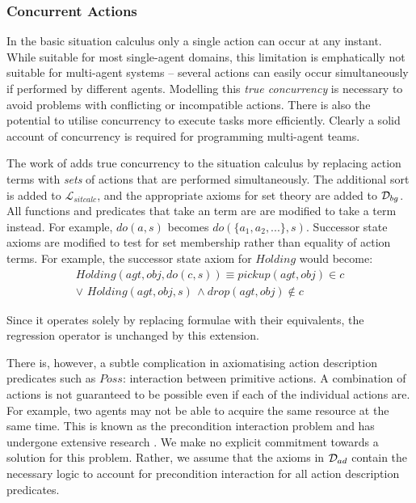 \subsubsection{Concurrent Actions}\label{sec:Background:Concurrent-Actions}

In the basic situation calculus only a single action can occur at
any instant. While suitable for most single-agent domains, this limitation
is emphatically not suitable for multi-agent systems -- several actions
can easily occur simultaneously if performed by different agents.
Modelling this \emph{true concurrency} is necessary to avoid problems
with conflicting or incompatible actions. There is also the potential
to utilise concurrency to execute tasks more efficiently. Clearly
a solid account of concurrency is required for programming multi-agent
teams.

The work of \citep{lin92sc_conc,pinto94temporal,reiter96sc_nat_conc}
adds true concurrency to the situation calculus by replacing action
terms with \emph{sets} of actions that are performed simultaneously.
The additional sort  is added to $\mathcal{L}_{sitcalc}$,
and the appropriate axioms for set theory are added to $\mathcal{D}_{bg}$.
All functions and predicates that take an  term are are
modified to take a  term instead. For example, $do(a,s)$
becomes $do(\{a_{1},a_{2},...\},s)$. Successor state axioms are modified
to test for set membership rather than equality of action terms. For
example, the successor state axiom for $Holding$ would become:\begin{multline*}
Holding(agt,obj,do(c,s))\equiv pickup(agt,obj)\in c\\
\vee\,\, Holding(agt,obj,s)\,\wedge drop(agt,obj)\not\in c\end{multline*}


Since it operates solely by replacing formulae with their equivalents,
the regression operator is unchanged by this extension.

There is, however, a subtle complication in axiomatising action description
predicates such as $Poss$: interaction between primitive actions.
A combination of actions is not guaranteed to be possible even if
each of the individual actions are. For example, two agents may not
be able to acquire the same resource at the same time. This is known
as the precondition interaction problem and has undergone extensive
research \citep{pinto94temporal,pinto98interacting_effects,pinto00action_interaction}.
We make no explicit commitment towards a solution for this problem.
Rather, we assume that the axioms in $\mathcal{D}_{ad}$ contain the necessary
logic to account for precondition interaction for all action description
predicates.

